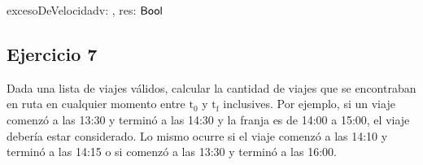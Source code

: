 \documentclass[a4paper]{article}
\begin{document}
\begin{proc}{excesoDeVelocidad}{\In v: \viaje, \Out res: $\mathsf{Bool}$}{}

    
    
    
\end{proc}

\pagebreak

\subsection{Ejercicio 7}

Dada una lista de viajes válidos, calcular la cantidad de viajes que se encontraban en ruta en cualquier momento entre $\mathrm{t_0}$ y $\mathrm{t_f}$ inclusives. Por ejemplo, si un viaje comenzó a las 13:30 y terminó a las 14:30 y la franja es de 14:00 a 15:00, el viaje debería estar considerado. Lo mismo ocurre si el viaje comenzó a las 14:10 y terminó a las 14:15 o si comenzó a las 13:30 y terminó a las 16:00.
\end{document}

